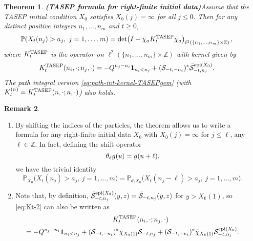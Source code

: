 \documentclass[letterpaper,reqno,11pt,oneside,final]{amsart}
\newtheorem{thm}{Theorem}[section]
\theoremstyle{definition}
\newtheorem{rem}[thm]{Remark}
\newcommand{\pp}{\mathbb{P}}
\newcommand{\zz}{\mathbb{Z}}
\newcommand{\uno}[1]{\mathbf{1}_{#1}}
\newcommand{\tts}{\hspace{0.05em}}
\newcommand{\uptext}[1]{\text{\upshape{#1}}}
\DeclareMathOperator{\epi}{\uptext{epi}}
\DeclareMathOperator{\oepi}{\epi}
\newcommand{\TASEP}{\uptext{TASEP}}
\newcommand{\SM}{\mathcal{S}}
\newcommand{\SN}{\bar{\mathcal{S}}}
\renewcommand{\P}{\chi}
\numberwithin{equation}{section}
\begin{document}
\begin{thm}{\bf (TASEP formula for right-finite initial data)}\label{thm:tasepformulas}
\enspace Assume that the TASEP initial condition $X_0$ satisfies $X_0(j)=\infty$ for all $j\le 0$.
Then for any distinct positive integers $n_1,\dotsc,n_m$ and $t\geq0$, 
\begin{equation}\label{eq:extKernelProb}
  \pp\!\left(X_t(n_j)>a_j,~j=1,\dotsc,m\right)=\det\!\left(I-\bar\chi_aK^\TASEP_t\bar\chi_a\right)_{\ell^2(\{n_1,\dotsc,n_m\}\times\zz)},
\end{equation}
where $K^\TASEP_t$ is the operator on $\ell^2(\{n_1,\dotsc,n_m\}\times\zz)$ with kernel given by
\begin{equation}\label{eq:Kt-2}
K^\TASEP_t(n_i,\cdot;n_j,\cdot)=-Q^{n_j-n_i}\uno{n_i<n_j}+(\SM_{-t,-{n}_i})^*{\SN}_{-t,n_j}^{\oepi(X_0)}.
\end{equation}
The path integral version \eqref{eq:path-int-kernel-TASEPgem} (with $K^{(n)}_t=K^\TASEP_t(n,\cdot;n,\cdot)$) also holds.  
\end{thm}

\noindent
\begin{minipage}{\textwidth}
\begin{rem}\label{rem:afterTASEPformula}
\leavevmode
\begin{enumerate}[label=\arabic*.,itemsep=3pt,leftmargin=30pt]
\item By shifting the indices of the particles, the theorem allows us to write a formula for any right-finite initial data $X_0$ with $X_0(j)=\infty$ for $j\leq\ell$, any $\ell\in\zz$.
In fact, defining the shift operator
\begin{equation}\label{eq:shift}
\theta_\ell\tts g(u)=g(u+\ell),
\end{equation}
we have the trivial identity
\begin{equation}\label{eq:transInv}
  \pp_{X_0}\big(X_t(n_j)>a_j,~j=1,\dotsc,m\big)=\pp_{\theta_{\ell}X_0}\big(X_t(n_j-\ell)>a_j,~j=1,\dotsc,m\big).
\end{equation}
\item Note that, by definition, $\SN_{-t,n_j}^{\oepi(X_0)}(y,z)=\SN_{-t,n_j}(y,z)$  for $y>X_0(1)$, so \eqref{eq:Kt-2} can also be written as 
\begin{multline}
\mbox{}\hskip0.32in K^\TASEP_t(n_i,\cdot;n_j,\cdot)\\
=-Q^{n_j-n_i}\uno{n_i<n_j}+(\SM_{-t,-{n}_i})^*\P_{X_0(1)}\SN_{-t,{n}_j}+(\SM_{-t,-{n}_i})^*\bar{\P}_{X_0(1)}{\SN}_{-t,n_j}^{\oepi(X_0)}.\label{eq:Kt-2-alt}
\end{multline}
\end{enumerate}
\end{rem}
\end{minipage}
\end{document}
